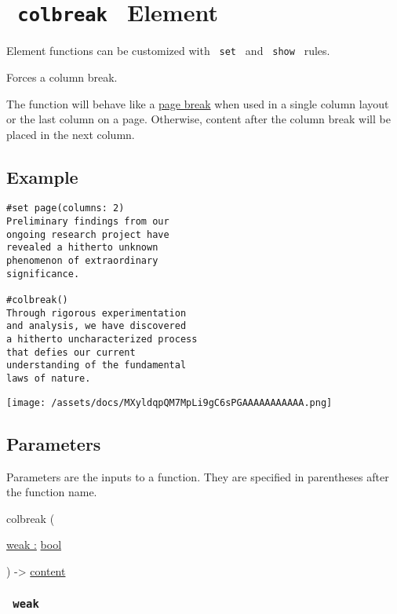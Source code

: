 \section{\texorpdfstring{\texttt{\ colbreak\ } {{ Element
}}}{ colbreak   Element }}\label{summary}

\label{element-tooltip}
Element functions can be customized with \texttt{\ set\ } and
\texttt{\ show\ } rules.

Forces a column break.

The function will behave like a
\href{/docs/reference/layout/pagebreak/}{page break} when used in a
single column layout or the last column on a page. Otherwise, content
after the column break will be placed in the next column.

\subsection{Example}\label{example}

\begin{verbatim}
#set page(columns: 2)
Preliminary findings from our
ongoing research project have
revealed a hitherto unknown
phenomenon of extraordinary
significance.

#colbreak()
Through rigorous experimentation
and analysis, we have discovered
a hitherto uncharacterized process
that defies our current
understanding of the fundamental
laws of nature.
\end{verbatim}

\texttt{[image: /assets/docs/MXyldqpQM7MpLi9gC6sPGAAAAAAAAAAA.png]}

\subsection{\texorpdfstring{{ Parameters
}}{ Parameters }}\label{parameters}

\label{parameters-tooltip}
Parameters are the inputs to a function. They are specified in
parentheses after the function name.

{ colbreak } (

{ \hyperref[parameters-weak]{weak :}
\href{/docs/reference/foundations/bool/}{bool} }

) -\textgreater{} \href{/docs/reference/foundations/content/}{content}

\subsubsection{\texorpdfstring{\texttt{\ weak\ }}{ weak }}\label{parameters-weak}

